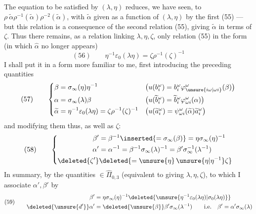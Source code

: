 The equation to be satisfied by $(\lambda,\eta)$ reduces, we have seen, to $\rho\ \widetilde\alpha\rho^{-1}(\widetilde\alpha)\rho^{-2}(\widetilde\alpha)$, with $\widetilde\alpha$ given as a function of $(\lambda,\eta)$ by the first   (55) --- but this relation  is a consequence of the second relation (55), giving $\widetilde\alpha$ in terms of $\zeta$. Thus there remains, as a relation linking $\lambda,\eta,\zeta$, only relation (55) in the form (in which $\widehat\alpha$ no longer appears)
\[
(56)\qquad\eta^{-1}\varepsilon_0(\lambda\eta)=\zeta\rho^{-1}(\zeta)^{-1}
\]
I shall put it in a form more familiar to me, first introducing the preceding quantities
\[
(57)\qquad\left\{\begin{aligned}
\beta&=\sigma_\infty(\eta)\eta^{-1}
&&\bigl(u(b_i^\omega)=b_i^\omega\varphi_{\unsure{i\omega|\omega i}}^\omega(\beta)\bigr)\\
\alpha&=\sigma_\infty(\lambda)\beta
&&\bigl(u(\widetilde b_i^\omega)=\widetilde b_i^\omega\varphi_{\omega i}^\omega(\alpha)\bigr)\\
\widetilde\alpha&=\eta^{-1}\varepsilon_0(\lambda\eta)=\zeta\rho^{-1}(\zeta)^{-1}
&&\bigl(u(\widetilde a_i^\omega)=\psi_{\omega i}^\omega(\widetilde\alpha)\widetilde a_i^\omega\bigr)
\end{aligned}\right.
\]
and modifying them thus, as well as $\zeta$:
\[
(58)\qquad\left\{\begin{aligned}
\beta'&=\beta^{-1}\inserted{=\sigma_\infty(\beta)}=\eta\sigma_\infty(\eta)^{-1}\\
\alpha'&=\alpha^{-1}=\beta^{-1}\sigma_\infty(\lambda)^{-1}=\beta'\sigma_\infty^{-1}(\lambda^{-1})\\
\deleted{\zeta'}&\deleted{=\unsure{\eta}\,\unsure{\eta|\eta^{-1}}\zeta}
\end{aligned}\right.
\]
In summary,  by the quantities  $\in\widehat\Pi_{0,3}$ (equivalent to giving $\lambda,\eta,\zeta$), to which I associate $\alpha',\beta'$ by
\[
(59)\qquad\begin{aligned}
\beta'&=\eta\sigma_\infty(\eta)^{-1}\deleted{\unsure{\eta^{-1}\varepsilon_0(\lambda\eta)|\sigma_0(\lambda\eta)}}\\
\deleted{\unsure{d'}}\alpha'&=\deleted{\unsure{\beta}}\beta'\sigma_\infty(\lambda^{-1})
\qquad\text{i.e.}\quad\beta'=\alpha'\sigma_\infty(\lambda)
\end{aligned}
\]
